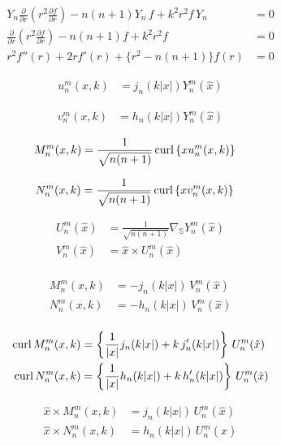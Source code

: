 \begin{align*}
  Y_n\frac{\partial}{\partial r}\left(r^2\frac{\partial f}{\partial r}\right) -n(n+1)Y_n\,f + k^2 r^2 f\,Y_n &= 0 \\
  \frac{\partial}{\partial r}\left(r^2\frac{\partial f}{\partial r}\right) -n(n+1)f + k^2 r^2 f &= 0 \\
  r^2 f''(r) + 2 r f'(r) + \{r^2 - n(n+1)\} f(r) &= 0
\end{align*}

\begin{align*}
  u_n^m(x, k) &= j_n(k|x|)Y_n^m(\hat{x})
\end{align*}

\begin{align*}
  v_n^m(x, k) &= h_n(k|x|)Y_n^m(\hat{x})
\end{align*}

\begin{align*}
  M_n^m(x, k) &=\frac{1}{\sqrt{n(n+1)}}\operatorname{curl}\left\{x u_n^m(x, k)\right\}
\end{align*}

\begin{align*}
  N_n^m(x, k) &=\frac{1}{\sqrt{n(n+1)}}\operatorname{curl}\left\{x v_n^m(x, k)\right\}
\end{align*}

\begin{align*}
  U_n^m(\hat{x}) &=\frac{1}{\sqrt{n(n+1)}}\nabla_{\mathbb{S}}Y_n^m(\hat{x}) \\
  V_n^m(\hat{x}) &=\hat{x}\times U_n^m(\hat{x})\\
\end{align*}

\begin{align*}
  M_n^m(x, k) &= -j_n(k|x|)\,V_n^m(\hat{x}) \\
  N_n^m(x, k) &= -h_n(k|x|)\,V_n^m(\hat{x}) \\
\end{align*}

\begin{align*}
  \operatorname{curl} M_n^m(x, k) &= \left\{\frac{1}{|x|}j_n(k|x|) + k\,j_n'(k|x|)\right\}\,U_n^m(\hat{x})\\
  \operatorname{curl} N_n^m(x, k) &= \left\{\frac{1}{|x|}h_n(k|x|) + k\,h_n'(k|x|)\right\}\,U_n^m(\hat{x})\\
\end{align*}

\begin{align*}
  \hat{x}\times M_n^m(x, k) &= j_n(k|x|)\,U_n^m(\hat{x}) \\
  \hat{x}\times N_n^m(x, k) &= h_n(k|x|)\,U_n^m(\hat{x}) 
\end{align*}


